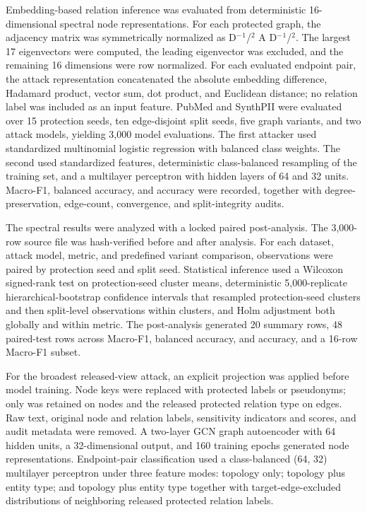 \documentclass[preprint,12pt]{elsarticle}
\begin{document}
Embedding-based relation inference was evaluated from deterministic 16-dimensional spectral node representations. For each protected graph, the adjacency matrix was symmetrically normalized as D$^{-}$$^{1}$/$^{2}$ A D$^{-}$$^{1}$/$^{2}$. The largest 17 eigenvectors were computed, the leading eigenvector was excluded, and the remaining 16 dimensions were row normalized. For each evaluated endpoint pair, the attack representation concatenated the absolute embedding difference, Hadamard product, vector sum, dot product, and Euclidean distance; no relation label was included as an input feature. PubMed and SynthPII were evaluated over 15 protection seeds, ten edge-disjoint split seeds, five graph variants, and two attack models, yielding 3,000 model evaluations. The first attacker used standardized multinomial logistic regression with balanced class weights. The second used standardized features, deterministic class-balanced resampling of the training set, and a multilayer perceptron with hidden layers of 64 and 32 units. Macro-F1, balanced accuracy, and accuracy were recorded, together with degree-preservation, edge-count, convergence, and split-integrity audits.

The spectral results were analyzed with a locked paired post-analysis. The 3,000-row source file was hash-verified before and after analysis. For each dataset, attack model, metric, and predefined variant comparison, observations were paired by protection seed and split seed. Statistical inference used a Wilcoxon signed-rank test on protection-seed cluster means, deterministic 5,000-replicate hierarchical-bootstrap confidence intervals that resampled protection-seed clusters and then split-level observations within clusters, and Holm adjustment both globally and within metric. The post-analysis generated 20 summary rows, 48 paired-test rows across Macro-F1, balanced accuracy, and accuracy, and a 16-row Macro-F1 subset.

For the broadest released-view attack, an explicit  projection was applied before model training. Node keys were replaced with protected labels or pseudonyms; only  was retained on nodes and the released protected relation type on edges. Raw text, original node and relation labels, sensitivity indicators and scores, and audit metadata were removed. A two-layer GCN graph autoencoder with 64 hidden units, a 32-dimensional output, and 160 training epochs generated node representations. Endpoint-pair classification used a class-balanced (64, 32) multilayer perceptron under three feature modes: topology only; topology plus entity type; and topology plus entity type together with target-edge-excluded distributions of neighboring released protected relation labels.
\end{document}
